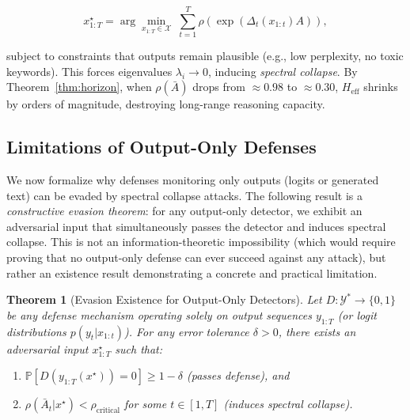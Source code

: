 \documentclass[10pt,twocolumn]{article}
\newtheorem{theorem}{Theorem}
\begin{document}
\begin{equation}
x^\star_{1:T} = \arg\min_{x_{1:T} \in \mathcal{X}} \; \sum_{t=1}^{T} \rho\!\left(\exp(\Delta_t(x_{1:t}) A)\right),
\label{eq:attack_objective}
\end{equation}

subject to constraints that outputs remain plausible (e.g., low perplexity, no toxic keywords). This forces eigenvalues $\lambda_i \to 0$, inducing \emph{spectral collapse}. By Theorem~\ref{thm:horizon}, when $\rho(\bar{A})$ drops from $\approx 0.98$ to $\approx 0.30$, $H_{\text{eff}}$ shrinks by orders of magnitude, destroying long-range reasoning capacity.

\subsection{Limitations of Output-Only Defenses}

We now formalize why defenses monitoring only outputs (logits or generated text) can be evaded by spectral collapse attacks. The following result is a \emph{constructive evasion theorem}: for any output-only detector, we exhibit an adversarial input that simultaneously passes the detector and induces spectral collapse. This is not an information-theoretic impossibility (which would require proving that no output-only defense can ever succeed against any attack), but rather an existence result demonstrating a concrete and practical limitation.

\begin{theorem}[Evasion Existence for Output-Only Detectors]
\label{thm:impossibility}
Let $D: \mathcal{Y}^* \to \{0,1\}$ be any defense mechanism operating solely on output sequences $y_{1:T}$ (or logit distributions $p(y_t|x_{1:t})$). For any error tolerance $\delta > 0$, there exists an adversarial input $x^\star_{1:T}$ such that:
\begin{enumerate}
\item $\mathbb{P}[D(y_{1:T}(x^\star)) = 0] \ge 1 - \delta$ (passes defense), and
\item $\rho(\bar{A}_t | x^\star) < \rho_{\text{critical}}$ for some $t \in [1,T]$ (induces spectral collapse).
\end{enumerate}
\end{theorem}
\end{document}
